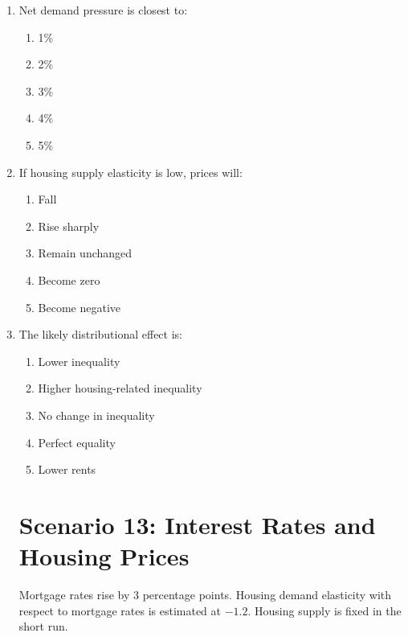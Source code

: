 \documentclass[12pt]{article}
\begin{document}
\begin{enumerate}[label=\textbf{\arabic*.}]
\section*{Scenario 12: Immigration and Housing Demand}

Canada increases immigration targets. Population rises by 3\%, but housing supply rises by only 1\%.

\item Net demand pressure is closest to:
\begin{enumerate}[label=\Alph*.]
\item 1\%
\item 2\%
\item 3\%
\item 4\%
\item 5\%
\end{enumerate}

\item If housing supply elasticity is low, prices will:
\begin{enumerate}[label=\Alph*.]
\item Fall
\item Rise sharply
\item Remain unchanged
\item Become zero
\item Become negative
\end{enumerate}

\item The likely distributional effect is:
\begin{enumerate}[label=\Alph*.]
\item Lower inequality
\item Higher housing-related inequality
\item No change in inequality
\item Perfect equality
\item Lower rents
\end{enumerate}

\section*{Scenario 13: Interest Rates and Housing Prices}

Mortgage rates rise by 3 percentage points. Housing demand elasticity with respect to mortgage rates is estimated at \(-1.2\). Housing supply is fixed in the short run.


\end{enumerate}
\end{document}
